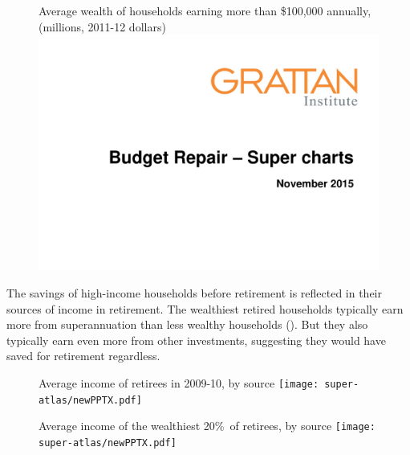 \begin{figure}
%
{Average wealth of households earning more than \$100,000 annually, (millions, 2011-12 dollars)}\label{fig:SUPER-3-2}
\includegraphics[width=\columnwidth,page=11]{super-atlas/PPTX.pdf}

\end{figure}

The savings of high-income households before retirement is reflected in their sources of income in retirement. The wealthiest retired households typically earn more from superannuation than less wealthy households (). But they also typically earn even more from other investments, suggesting they would have saved for retirement regardless.

\begin{figure}
\begin{minipage}{\columnwidth}
%
{Average income of retirees in 2009-10, by source}\label{fig:SUPER-3-3}
\texttt{[image: super-atlas/newPPTX.pdf]}
\end{minipage}
\begin{minipage}{\columnwidth}
%
{Average income of the wealthiest 20\%\ of retirees, by source}\label{fig:SUPER-3-4}
\texttt{[image: super-atlas/newPPTX.pdf]}
\end{minipage}

\end{figure}

